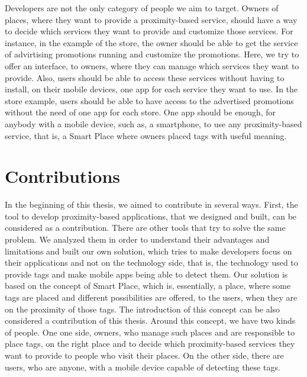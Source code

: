Developers are not the only category of people we aim to target.
Owners of places, where they want to provide a proximity-based service, should have a way to decide which services they want to provide and customize those services.
For instance, in the example of the store, the owner should be able to get the service of advirtising promotions running and customize the promotions.
Here, we try to offer an interface, to owners, where they can manage which services they want to provide.
Also, users should be able to access these services without having to install, on their mobile devices, one app for each service they want to use.
In the store example, users should be able to have access to the advertised promotions without the need of one app for each store.
One app should be enough, for anybody with a mobile device, such as, a smartphone, to use any proximity-based service, that is, a Smart Place where owners placed tags with useful meaning.

\section{Contributions}
\label{sec:introduction_contributions}
In the beginning of this thesis, we aimed to contribute in several ways.
First, the tool to develop proximity-based applications, that we designed and built, can be considered as a contribution.
There are other tools that try to solve the same problem.
We analyzed them in order to understand their advantages and limitations and built our own solution, which tries to make developers focus on their applications and not on the technology side, that is, the technology used to provide tags and make mobile apps being able to detect them.
Our solution is based on the concept of Smart Place, which is, essentially, a place, where some tags are placed and different possibilities are offered, to the users, when they are on the proximity of those tags.
The introduction of this concept can be also considered a contribution of this thesis.
Around this concept, we have two kinds of people.
One one side, owners, who manage such places and are responsible to place tags, on the right place and to decide which proximity-based services they want to provide to people who visit their places.
On the other side, there are users, who are anyone, with a mobile device capable of detecting these tags.

